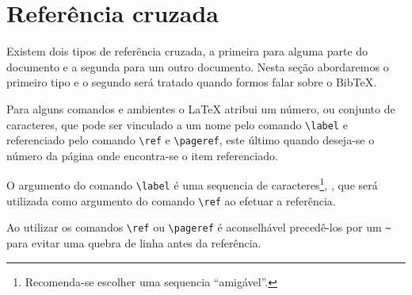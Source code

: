 \section{Referência cruzada} \label{sse:cross_reference}
Existem dois tipos de referência cruzada, a primeira para alguma parte do documento e a segunda para um outro
documento. Nesta seção abordaremos o primeiro tipo e o segundo será tratado
quando formos falar sobre o BibTeX.

Para alguns comandos e ambientes o LaTeX atribui um número, ou conjunto de
caracteres, que pode ser vinculado a um nome pelo comando
\lstinline!\label! e referenciado pelo
comando \lstinline!\ref! e
\lstinline!\pageref!, este último quando deseja-se o número da página onde
encontra-se o item referenciado.

O argumento do comando \lstinline!\label! é uma sequencia de
caracteres\footnote{Recomenda-se escolher uma sequencia ``amigável''.},
, que será utilizada como argumento do comando
\lstinline!\ref! ao efetuar a referência.

Ao utilizar os comandos \lstinline!\ref! ou \lstinline!\pageref! é aconselhável
precedê-los por um \lstinline!~! para evitar uma quebra de linha antes da
referência.
